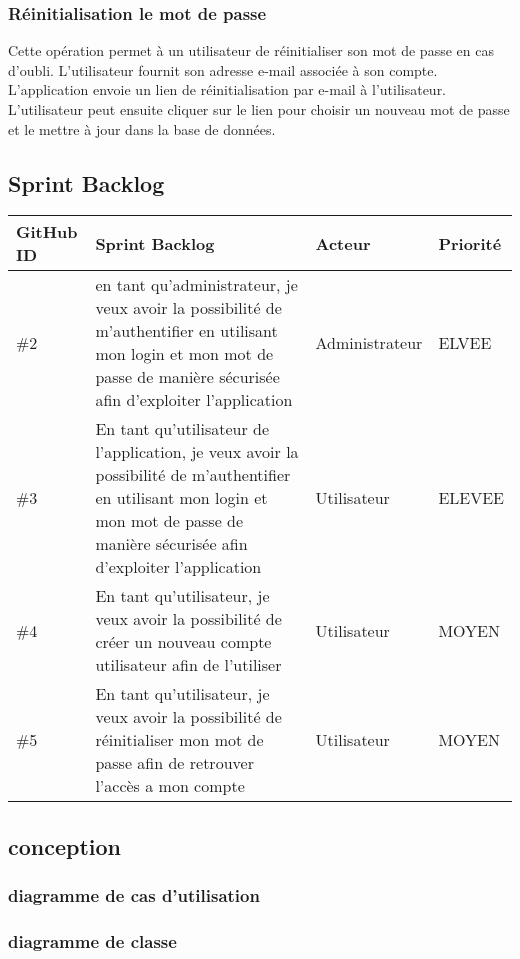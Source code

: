 \subsubsection{Réinitialisation le mot de passe}
Cette opération permet à un utilisateur de réinitialiser son mot de passe en cas d'oubli. L'utilisateur fournit son adresse e-mail associée à son compte. L'application envoie un lien de réinitialisation par e-mail à l'utilisateur. L'utilisateur peut ensuite cliquer sur le lien pour choisir un nouveau mot de passe et le mettre à jour dans la base de données.
\subsection{Sprint Backlog}
\begin{center}
    \begin{tabular}{ | m{1cm} | m{9cm}| m{2cm} | m{2cm} |} 
     \hline
     GitHub ID & Sprint Backlog & Acteur & Priorité \\ [0.5ex] 
     \hline\hline
     \#2 & en tant qu'administrateur, je veux avoir la possibilité de m'authentifier en utilisant mon login et mon mot de passe de manière sécurisée afin d'exploiter l'application & Administrateur & ELVEE \\ 
     \hline
     \#3  & En tant qu'utilisateur de l'application, je veux avoir la possibilité de m'authentifier en utilisant mon login et mon mot de passe de manière sécurisée afin d'exploiter l'application & Utilisateur & ELEVEE \\
     \hline
     \#4 & En tant qu'utilisateur, je veux avoir la possibilité de créer un nouveau compte utilisateur afin de l'utiliser & Utilisateur & MOYEN \\
     \hline
     \#5 & En tant qu'utilisateur, je veux avoir la possibilité de réinitialiser mon mot de passe afin de retrouver l'accès a mon compte & Utilisateur & MOYEN \\ [1ex] 
     \hline
    \end{tabular}
    \end{center}
\subsection{conception}
\subsubsection{diagramme de cas d'utilisation}

\subsubsection{diagramme de classe}

